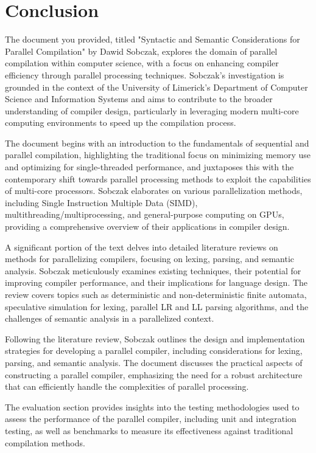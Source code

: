 \chapter{Conclusion} \label{conclusion}
The document you provided, titled "Syntactic and Semantic Considerations
for Parallel Compilation" by Dawid Sobczak, explores the domain of parallel
compilation within computer science, with a focus on enhancing compiler
efficiency through parallel processing techniques. Sobczak's investigation
is grounded in the context of the University of Limerick's Department of
Computer Science and Information Systems and aims to contribute to the broader
understanding of compiler design, particularly in leveraging modern multi-core
computing environments to speed up the compilation process.

The document begins with an introduction to the fundamentals of sequential
and parallel compilation, highlighting the traditional focus on minimizing
memory use and optimizing for single-threaded performance, and juxtaposes this
with the contemporary shift towards parallel processing methods to exploit
the capabilities of multi-core processors. Sobczak elaborates on various
parallelization methods, including Single Instruction Multiple Data (SIMD),
multithreading/multiprocessing, and general-purpose computing on GPUs, providing
a comprehensive overview of their applications in compiler design.

A significant portion of the text delves into detailed literature reviews on
methods for parallelizing compilers, focusing on lexing, parsing, and semantic
analysis. Sobczak meticulously examines existing techniques, their potential
for improving compiler performance, and their implications for language
design. The review covers topics such as deterministic and non-deterministic
finite automata, speculative simulation for lexing, parallel LR and LL parsing
algorithms, and the challenges of semantic analysis in a parallelized context.

Following the literature review, Sobczak outlines the design and implementation
strategies for developing a parallel compiler, including considerations for
lexing, parsing, and semantic analysis. The document discusses the practical
aspects of constructing a parallel compiler, emphasizing the need for a
robust architecture that can efficiently handle the complexities of parallel
processing.

The evaluation section provides insights into the testing methodologies used to
assess the performance of the parallel compiler, including unit and integration
testing, as well as benchmarks to measure its effectiveness against traditional
compilation methods.

